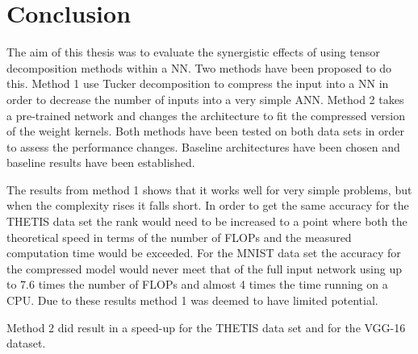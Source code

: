 \section{Conclusion} \label{tex:conclusion}
The aim of this thesis was to evaluate the synergistic effects of using tensor decomposition methods within a NN. Two methods have been proposed to do this. Method 1 use Tucker decomposition to compress the input into a NN in order to decrease the number of inputs into a very simple ANN. Method 2 takes a pre-trained network and changes the architecture to fit the compressed version of the weight kernels. Both methods have been tested on both data sets in order to assess the performance changes. Baseline architectures have been chosen and baseline results have been established. 

The results from method 1 shows that it works well for very simple problems, but when the complexity rises it falls short. In order to get the same accuracy for the THETIS data set the rank would need to be increased to a point where both the theoretical speed in terms of the number of FLOPs and the measured computation time would be exceeded. For the MNIST data set the accuracy for the compressed model would never meet that of the full input network using up to 7.6 times the number of FLOPs and almost 4 times the time running on a CPU. Due to these results method 1 was deemed to have limited potential.

Method 2 did result in a speed-up for the THETIS data set and for the VGG-16 dataset. 